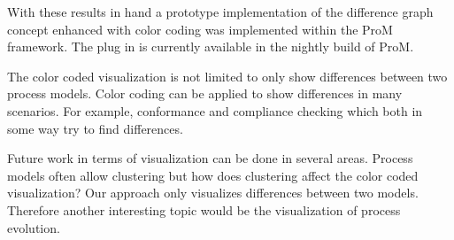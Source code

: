 \documentclass{llncs}
\begin{document}
With these results in hand a prototype implementation of the difference graph concept enhanced with color coding was implemented within the ProM framework. The plug in is currently available in the nightly build of ProM.

The color coded visualization is not limited to only show differences between two process models. Color coding can be applied to show differences in many scenarios. For example, conformance and compliance checking which both in some way try to find differences.

Future work in terms of visualization can be done in several areas. Process models often allow clustering but how does clustering affect the color coded visualization? Our approach only visualizes differences between two models. Therefore another interesting topic would be the visualization of process evolution. 



\end{document}
